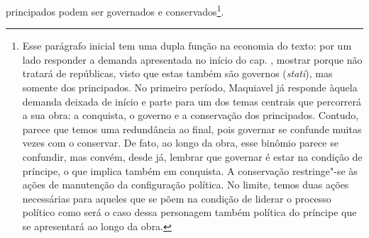 principados podem ser governados e conservados\footnote{Esse parágrafo
  inicial tem uma dupla função na economia do texto: por um lado
  responder a demanda apresentada no início do cap. , mostrar porque
  não tratará de repúblicas, visto que estas também são governos
  (\emph{stati}), mas somente dos principados. No primeiro período,
  Maquiavel já responde àquela demanda deixada de início e parte para um
  dos temas centrais que percorrerá a sua obra: a conquista, o governo e
  a conservação dos principados. Contudo, parece que temos uma
  redundância ao final, pois governar se confunde muitas vezes com o
  conservar. De fato, ao longo da obra, esse binômio parece se
  confundir, mas convém, desde já, lembrar que governar é estar na
  condição de príncipe, o que implica também em conquista. A conservação
  restringe"-se às ações de manutenção da configuração política. No
  limite, temos duas ações necessárias para aqueles que se põem na
  condição de liderar o processo político como será o caso dessa
  personagem também política do príncipe que se apresentará ao longo da
  obra.}.

